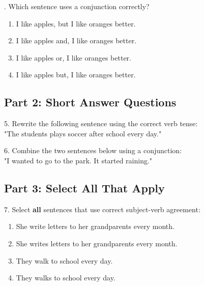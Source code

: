 \documentclass[12pt]{article}
\begin{document}
\vspace{1cm}
. Which sentence uses a conjunction correctly?\\
\begin{enumerate}[label=\Alph*.]
    \item I like apples, but I like oranges better.  
    \item I like apples and, I like oranges better.  
    \item I like apples or, I like oranges better.  
    \item I like apples but, I like oranges better.  
\end{enumerate}

\vspace{1cm}


\subsection*{Part 2: Short Answer Questions}

5. Rewrite the following sentence using the correct verb tense: \\
"The students plays soccer after school every day."\\
\vspace{3cm}

6. Combine the two sentences below using a conjunction: \\
"I wanted to go to the park. It started raining."\\
\vspace{3cm}

\subsection*{Part 3: Select All That Apply}

7. Select \textbf{all} sentences that use correct subject-verb agreement:\\
\begin{enumerate}[label=\Alph*.]
    \item She write letters to her grandparents every month.  
    \item She writes letters to her grandparents every month.  
    \item They walk to school every day.  
    \item They walks to school every day.  
\end{enumerate}

\vspace{1cm}
\end{document}
